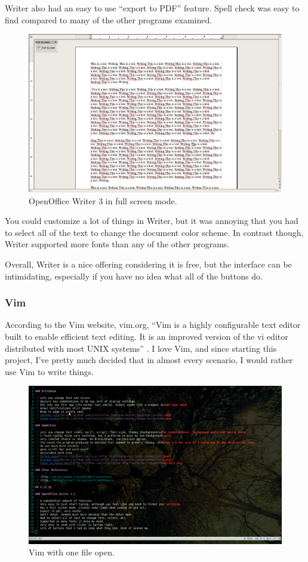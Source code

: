 \documentclass[10pt]{article}
\begin{document}
Writer also had an easy to use ``export to PDF'' feature. Spell check was easy to find compared to many of the other programs examined.

\begin{figure}
   \centering
      \includegraphics[width=130mm]{images/oo3.png}
   \caption{OpenOffice Writer 3 in full screen mode.}
\end{figure}

You could customize a lot of things in Writer, but it was annoying that you had to select all of the text to change the document color scheme. In contrast though, Writer supported more fonts than any of the other programs.

Overall, Writer is a nice offering considering it is free, but the interface can be intimidating, especially if you have no idea what all of the buttons do.

\subsubsection{Vim}

According to the Vim website, vim.org, ``Vim is a highly configurable text editor built to enable efficient text editing. It is an improved version of the vi editor distributed with most UNIX systems'' \cite{vimabout}. I love Vim, and since starting this project, I've pretty much decided that in almost every scenario, I would rather use Vim to write things.

\begin{figure}
   \centering
      \includegraphics[width=130mm]{images/vim2.png}
   \caption{Vim with one file open.}
\end{figure}
\end{document}
